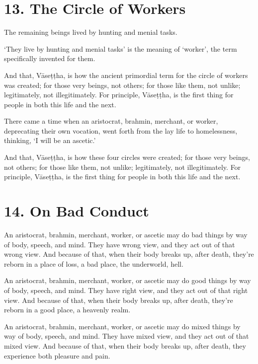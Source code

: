 \documentclass[12pt,openany]{book}%
\begin{document}
\section*{13. The Circle of Workers }

The remaining beings lived by hunting and menial tasks. 

‘They live by hunting and menial tasks’ is the meaning of ‘worker’, the term specifically invented for them. 

And that, \textsanskrit{Vāseṭṭha}, is how the ancient primordial term for the circle of workers was created; for those very beings, not others; for those like them, not unlike; legitimately, not illegitimately. For principle, \textsanskrit{Vāseṭṭha}, is the first thing for people in both this life and the next. 

There came a time when an aristocrat, brahmin, merchant, or worker, deprecating their own vocation, went forth from the lay life to homelessness, thinking, ‘I will be an ascetic.’ 

And that, \textsanskrit{Vāseṭṭha}, is how these four circles were created; for those very beings, not others; for those like them, not unlike; legitimately, not illegitimately. For principle, \textsanskrit{Vāseṭṭha}, is the first thing for people in both this life and the next. 

\section*{14. On Bad Conduct }

An aristocrat, brahmin, merchant, worker, or ascetic may do bad things by way of body, speech, and mind. They have wrong view, and they act out of that wrong view. And because of that, when their body breaks up, after death, they’re reborn in a place of loss, a bad place, the underworld, hell. 

An aristocrat, brahmin, merchant, worker, or ascetic may do good things by way of body, speech, and mind. They have right view, and they act out of that right view. And because of that, when their body breaks up, after death, they’re reborn in a good place, a heavenly realm. 

An aristocrat, brahmin, merchant, worker, or ascetic may do mixed things by way of body, speech, and mind. They have mixed view, and they act out of that mixed view. And because of that, when their body breaks up, after death, they experience both pleasure and pain. 
\end{document}

